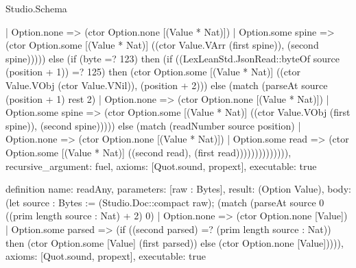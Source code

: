\begin{lexlean}{Studio.Schema}
\begin{semanticmodule}
{      | Option.none => (ctor Option.none [(Value * Nat)])
      | Option.some spine => (ctor Option.some [(Value * Nat)] ((ctor Value.VArr (first spine)), (second spine))))) else (if (byte =? 123) then (if ((LexLeanStd.JsonRead::byteOf source (position + 1)) =? 125) then (ctor Option.some [(Value * Nat)] ((ctor Value.VObj (ctor Value.VNil)), (position + 2))) else (match (parseAt source (position + 1) rest 2)
      | Option.none => (ctor Option.none [(Value * Nat)])
      | Option.some spine => (ctor Option.some [(Value * Nat)] ((ctor Value.VObj (first spine)), (second spine))))) else (match (readNumber source position)
      | Option.none => (ctor Option.none [(Value * Nat)])
      | Option.some read => (ctor Option.some [(Value * Nat)] ((second read), (first read)))))))))))))),
  recursive_argument: fuel,
  axioms: [Quot.sound, propext],
  executable: true
}

definition{
  name: readAny,
  parameters: [raw : Bytes],
  result: (Option Value),
  body: (let source : Bytes := (Studio.Doc::compact raw); (match (parseAt source 0 ((prim length source : Nat) + 2) 0)
    | Option.none => (ctor Option.none [Value])
    | Option.some parsed => (if ((second parsed) =? (prim length source : Nat)) then (ctor Option.some [Value] (first parsed)) else (ctor Option.none [Value])))),
  axioms: [Quot.sound, propext],
  executable: true
}


\end{semanticmodule}
\end{lexlean}
